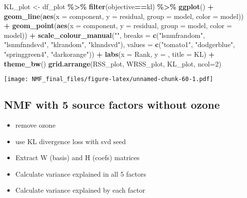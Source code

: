 \documentclass[
]{article}
\newenvironment{Shaded}{\begin{snugshade}}{\end{snugshade}}
\newcommand{\AttributeTok}[1]{\textcolor[rgb]{0.13,0.29,0.53}{#1}}
\newcommand{\DecValTok}[1]{\textcolor[rgb]{0.00,0.00,0.81}{#1}}
\newcommand{\FunctionTok}[1]{\textcolor[rgb]{0.13,0.29,0.53}{\textbf{#1}}}
\newcommand{\NormalTok}[1]{#1}
\newcommand{\OtherTok}[1]{\textcolor[rgb]{0.56,0.35,0.01}{#1}}
\newcommand{\SpecialCharTok}[1]{\textcolor[rgb]{0.81,0.36,0.00}{\textbf{#1}}}
\newcommand{\StringTok}[1]{\textcolor[rgb]{0.31,0.60,0.02}{#1}}
\providecommand{\tightlist}{%
  \setlength{\itemsep}{0pt}\setlength{\parskip}{0pt}}
\begin{document}
\begin{Shaded}
\begin{Highlighting}[]
\NormalTok{KL\_plot }\OtherTok{\textless{}{-}}\NormalTok{ df\_plot }\SpecialCharTok{\%\textgreater{}\%}
  \FunctionTok{filter}\NormalTok{(objective}\SpecialCharTok{==}\StringTok{\textquotesingle{}kl\textquotesingle{}}\NormalTok{) }\SpecialCharTok{\%\textgreater{}\%}
  \FunctionTok{ggplot}\NormalTok{() }\SpecialCharTok{+}
  \FunctionTok{geom\_line}\NormalTok{(}\FunctionTok{aes}\NormalTok{(}\AttributeTok{x =}\NormalTok{ component, }\AttributeTok{y =}\NormalTok{ residual, }\AttributeTok{group =}\NormalTok{ model, }\AttributeTok{color =}\NormalTok{ model)) }\SpecialCharTok{+}
  \FunctionTok{geom\_point}\NormalTok{(}\FunctionTok{aes}\NormalTok{(}\AttributeTok{x =}\NormalTok{ component, }\AttributeTok{y =}\NormalTok{ residual, }\AttributeTok{group =}\NormalTok{ model, }\AttributeTok{color =}\NormalTok{ model)) }\SpecialCharTok{+}
  \FunctionTok{scale\_colour\_manual}\NormalTok{(}\StringTok{""}\NormalTok{, }
                    \AttributeTok{breaks =} \FunctionTok{c}\NormalTok{(}\StringTok{"lsnmfrandom"}\NormalTok{, }\StringTok{"lsnmfnndsvd"}\NormalTok{,}
                               \StringTok{"klrandom"}\NormalTok{, }\StringTok{"klnndsvd"}\NormalTok{),}
                    \AttributeTok{values =} \FunctionTok{c}\NormalTok{(}\StringTok{"tomato1"}\NormalTok{, }\StringTok{"dodgerblue"}\NormalTok{,}
                               \StringTok{"springgreen4"}\NormalTok{, }\StringTok{"darkorange"}\NormalTok{)) }\SpecialCharTok{+}
  \FunctionTok{labs}\NormalTok{(}\AttributeTok{x =} \StringTok{\textquotesingle{}Rank\textquotesingle{}}\NormalTok{, }\AttributeTok{y =} \StringTok{\textquotesingle{}\textquotesingle{}}\NormalTok{, }\AttributeTok{title =} \StringTok{\textquotesingle{}KL\textquotesingle{}}\NormalTok{) }\SpecialCharTok{+}
  \FunctionTok{theme\_bw}\NormalTok{()}
\FunctionTok{grid.arrange}\NormalTok{(RSS\_plot, WRSS\_plot, KL\_plot, }\AttributeTok{ncol=}\DecValTok{2}\NormalTok{)}
\end{Highlighting}
\end{Shaded}

\texttt{[image: NMF\_final\_files/figure-latex/unnamed-chunk-60-1.pdf]}

\subsection{NMF with 5 source factors without
ozone}\label{nmf-with-5-source-factors-without-ozone}

\begin{itemize}
\tightlist
\item
  remove ozone
\item
  use KL divergence loss with svd seed
\item
  Extract W (basis) and H (coefs) matrices
\item
  Calculate variance explained in all 5 factors
\item
  Calculate variance explained by each factor
\end{itemize}
\end{document}

